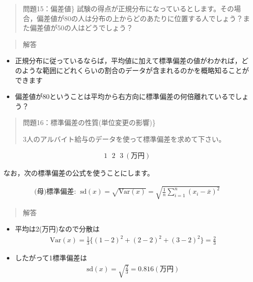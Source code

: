 \documentclass[
]{book}
\providecommand{\tightlist}{%
  \setlength{\itemsep}{0pt}\setlength{\parskip}{0pt}}
\theoremstyle{definition}
\theoremstyle{definition}
\theoremstyle{definition}
\theoremstyle{definition}
\theoremstyle{remark}
\begin{document}
\begin{quote}
問題15：偏差値\}
試験の得点が正規分布になっているとします。その場合，偏差値が80の人は分布の上からどのあたりに位置する人でしょう？また偏差値が50の人はどうでしょう？
\end{quote}

\begin{quote}
解答
\end{quote}

\begin{itemize}
\tightlist
\item
  正規分布に従っているならば，平均値に加えて標準偏差の値がわかれば，どのような範囲にどれくらいの割合のデータが含まれるのかを概略知ることができます
\end{itemize}

\begin{itemize}
\tightlist
\item
  偏差値が80ということは平均から右方向に標準偏差の何倍離れているでしょう？
\end{itemize}

\begin{quote}
問題16：標準偏差の性質(単位変更の影響)\}

3人のアルバイト給与のデータを使って標準偏差を求めて下さい。
\end{quote}

\begin{align*}
1~~~2~~~3~(\text{万円})
\end{align*}

なお，次の標準偏差の公式を使うことにします。

\begin{align*}
\text{(母)標準偏差}:~~\text{sd}(x)
=\sqrt{\text{Var}(x)}
=\sqrt{\frac{1}{n} \sum_{i=1}^n (x_i-\bar{x})^2} 
\end{align*}

\begin{quote}
解答
\end{quote}

\begin{itemize}
\tightlist
\item
  平均は2(万円)なので分散は
  \begin{align*}
  \text{Var}(x)=\frac{1}{3} \{ (1-2)^2+(2-2)^2+(3-2)^2 \}=\frac{2}{3}
  \end{align*}
\item
  したがって1標準偏差は
  \begin{align*}
  \text{sd}(x)=\sqrt{\frac{2}{3}}=0.816(\text{万円})
  \end{align*}
\end{itemize}
\end{document}
